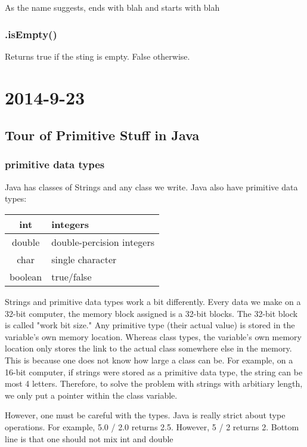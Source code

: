 \documentclass [12 pt, twoside] {article}
\begin{document}
As the name suggests, ends with blah and starts with blah


\subsubsection{.isEmpty()}


Returns true if the sting is empty. False otherwise.


\section{2014-9-23}
\subsection{Tour of Primitive Stuff in Java}
\subsubsection{primitive data types}


Java has classes of Strings and any class we write.
Java also have primitive data types:


\newline


\begin{tabular}{|c|l|}
\hline
int & integers \\
\hline
double & double-percision integers \\
\hline
char & single character \\
\hline
boolean & true/false \\
\hline
\end{tabular}


\newline


Strings and primitive data types work a bit differently.
Every data we make on a 32-bit computer, the memory block assigned is a 32-bit blocks.
The 32-bit block is called "work bit size."
Any primitive type (their actual value) is stored in the variable's own memory location.
Whereas class types, the variable's own memory location only stores the link to the actual class somewhere else in the memory.
This is because one does not know how large a class can be.
For example, on a 16-bit computer, if strings were stored as a primitive data type, the string can be most 4 letters.
Therefore, to solve the problem with strings with arbitiary length, we only put a pointer within the class variable.


However, one must be careful with the types.
Java is really strict about type operations.
For example, 5.0 / 2.0 returns 2.5.
However, 5 / 2 returns 2.
Bottom line is that one should not mix int and double
\end{document}
